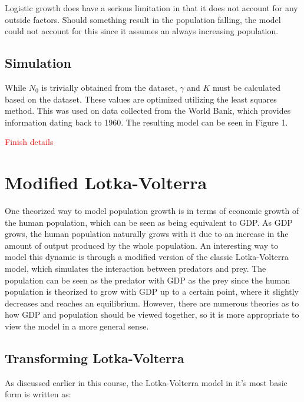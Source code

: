 \documentclass[a4paper]{article}
\newcommand{\todo}[1]{{\Large\textcolor{red}{#1}}}
\begin{document}
Logistic growth does have a serious limitation in that it does not account for any outside factors. Should something result in the population falling, the model could not account for this since it assumes an always increasing population. 

\subsection{Simulation}

While $N_0$ is trivially obtained from the dataset, $\gamma$ and $K$ must be calculated based on the dataset. These values are optimized utilizing the least squares method. This was used on data collected from the World Bank, which provides information dating back to 1960. The resulting model can be seen in Figure 1.


\todo{Finish details}

\section{Modified Lotka-Volterra}

One theorized way to model population growth is in terms of economic growth of the human population, which can be seen as being equivalent to GDP. As GDP grows, the human population naturally grows with it due to an increase in the amount of output produced by the whole population. An interesting way to model this dynamic is through a modified version of the classic Lotka-Volterra model, which simulates the interaction between predators and prey. The population can be seen as the predator with GDP as the prey since the human population is theorized to grow with GDP up to a certain point, where it slightly decreases and reaches an equilibrium. However, there are numerous theories as to how GDP and population should be viewed together, so it is more appropriate to view the model in a more general sense. 

\subsection{Transforming Lotka-Volterra}

As discussed earlier in this course, the Lotka-Volterra model in it's most basic form is written as:
\end{document}
